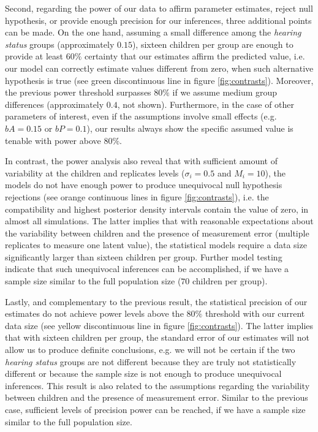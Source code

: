 Second, regarding the power of our data to affirm parameter estimates, reject null hypothesis, or provide enough precision for our inferences, three additional points can be made. On the one hand, assuming a small difference among the \textit{hearing status} groups (approximately $0.15$), sixteen children per group are enough to provide at least $60\%$ certainty that our estimates affirm the predicted value, i.e. our model can correctly estimate values different from zero, when such alternative hypothesis is true (see green discontinuous line in figure \ref{fig:contrasts}). Moreover, the previous power threshold surpasses $80\%$ if we assume medium group differences (approximately $0.4$, not shown). Furthermore, in the case of other parameters of interest, even if the assumptions involve small effects (e.g. $bA=0.15$ or $bP=0.1$), our results always show the specific assumed value is tenable with power above $80\%$.

In contrast, the power analysis also reveal that with sufficient amount of variability at the children and replicates levels ($\sigma_{i}=0.5$ and $M_{i}=10$), the models do not have enough power to produce unequivocal null hypothesis rejections (see orange continuous lines in figure \ref{fig:contrasts}), i.e. the compatibility and highest posterior density intervals contain the value of zero, in almost all simulations. The latter implies that with reasonable expectations about the variability between children and the presence of measurement error (multiple replicates to measure one latent value), the statistical models require a data size significantly larger than sixteen children per group. Further model testing indicate that such unequivocal inferences can be accomplished, if we have a sample size similar to the full population size ($70$ children per group).

Lastly, and complementary to the previous result, the statistical precision of our estimates do not achieve power levels above the $80\%$ threshold with our current data size (see yellow discontinuous line in figure \ref{fig:contrasts}). The latter implies that with sixteen children per group, the standard error of our estimates will not allow us to produce definite conclusions, e.g. we will not be certain if the two \textit{hearing status} groups are not different because they are truly not statistically different or because the sample size is not enough to produce unequivocal inferences. This result is also related to the assumptions regarding the variability between children and the presence of measurement error. Similar to the previous case, sufficient levels of precision power can be reached, if we have a sample size similar to the full population size.
%
\begin{comment}
	The results of our simulations indicated that each statistical model was able to recover the `real' parameters values, when the sample size was similar to the population size.
	
	Third and final, no parameter (nor any contrast) managed to reject the null hypothesis or achieve high estimates precision with power above the $80\%$ threshold.
\end{comment}

